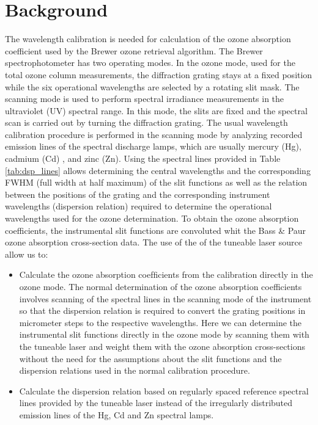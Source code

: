 \documentclass[acp, manuscript]{copernicus}
\begin{document}

\section{Background}

The wavelength calibration is needed for calculation of the ozone absorption coefficient used by the Brewer ozone retrieval algorithm. The Brewer spectrophotometer has two operating  modes. In the ozone mode, used for the total ozone column measurements, the diffraction grating stays at a fixed position while the six operational wavelengths are selected by a rotating slit mask.  The scanning mode is used to perform spectral irradiance measurements in the ultraviolet (UV) spectral range. In this mode, the slits are fixed and the spectral scan is carried out by turning the diffraction grating. The usual wavelength calibration procedure is performed in the scanning mode by analyzing recorded emission lines of the spectral discharge lamps, which are usually mercury (Hg), cadmium (Cd) , and zinc (Zn). Using the spectral lines provided in Table \ref{tab:dsp_lines} allows determining the central wavelengths and the corresponding FWHM (full width at half maximum) of the slit functions as well as the relation between the positions of the grating  and the corresponding instrument wavelengths (dispersion relation) required to determine the operational wavelengths used for the ozone determination. To obtain the ozone absorption coefficients, the instrumental slit functions are convoluted whit the Bass \& Paur ozone absorption cross-section data.
The use of the of the tuneable laser  source allow us to:
\begin{itemize}

    \item Calculate the ozone absorption coefﬁcients from the calibration directly in the ozone mode. The normal determination of the ozone absorption coefficients involves scanning of the spectral lines in the scanning mode of the instrument so that the dispersion relation is required to convert the grating positions in micrometer steps to the respective wavelengths. Here we can determine the instrumental slit functions directly in the ozone mode by scanning them with the tuneable laser and weight them with the ozone absorption cross-sections without the need for the assumptions about the slit functions and the dispersion relations used in the normal calibration procedure.
    \item Calculate the dispersion relation based on regularly spaced reference spectral lines provided by the tuneable laser instead of the irregularly distributed  emission lines of the  Hg, Cd and Zn spectral lamps. 
\end{itemize}
\end{document}
